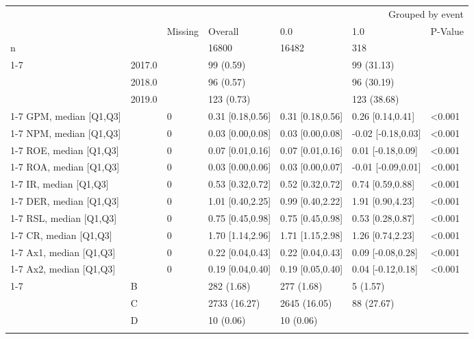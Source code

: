 \begin{tabular}{lllllll}
\toprule
 &  & \multicolumn{5}{r}{Grouped by event} \\
 &  & Missing & Overall & 0.0 & 1.0 & P-Value \\
\midrule
n &  &  & 16800 & 16482 & 318 &  \\
\cline{1-7}
\multirow[t]{4}{*}{time-event, n (%
 & 2017.0 &  & 99 (0.59) &  & 99 (31.13) &  \\
 & 2018.0 &  & 96 (0.57) &  & 96 (30.19) &  \\
 & 2019.0 &  & 123 (0.73) &  & 123 (38.68) &  \\
\cline{1-7}
GPM, median [Q1,Q3] &  & 0 & 0.31 [0.18,0.56] & 0.31 [0.18,0.56] & 0.26 [0.14,0.41] & <0.001 \\
\cline{1-7}
NPM, median [Q1,Q3] &  & 0 & 0.03 [0.00,0.08] & 0.03 [0.00,0.08] & -0.02 [-0.18,0.03] & <0.001 \\
\cline{1-7}
ROE, median [Q1,Q3] &  & 0 & 0.07 [0.01,0.16] & 0.07 [0.01,0.16] & 0.01 [-0.18,0.09] & <0.001 \\
\cline{1-7}
ROA, median [Q1,Q3] &  & 0 & 0.03 [0.00,0.06] & 0.03 [0.00,0.07] & -0.01 [-0.09,0.01] & <0.001 \\
\cline{1-7}
IR, median [Q1,Q3] &  & 0 & 0.53 [0.32,0.72] & 0.52 [0.32,0.72] & 0.74 [0.59,0.88] & <0.001 \\
\cline{1-7}
DER, median [Q1,Q3] &  & 0 & 1.01 [0.40,2.25] & 0.99 [0.40,2.22] & 1.91 [0.90,4.23] & <0.001 \\
\cline{1-7}
RSL, median [Q1,Q3] &  & 0 & 0.75 [0.45,0.98] & 0.75 [0.45,0.98] & 0.53 [0.28,0.87] & <0.001 \\
\cline{1-7}
CR, median [Q1,Q3] &  & 0 & 1.70 [1.14,2.96] & 1.71 [1.15,2.98] & 1.26 [0.74,2.23] & <0.001 \\
\cline{1-7}
Ax1, median [Q1,Q3] &  & 0 & 0.22 [0.04,0.43] & 0.22 [0.04,0.43] & 0.09 [-0.08,0.28] & <0.001 \\
\cline{1-7}
Ax2, median [Q1,Q3] &  & 0 & 0.19 [0.04,0.40] & 0.19 [0.05,0.40] & 0.04 [-0.12,0.18] & <0.001 \\
\cline{1-7}
\multirow[t]{20}{*}{Sector, n (%
 & B &  & 282 (1.68) & 277 (1.68) & 5 (1.57) &  \\
 & C &  & 2733 (16.27) & 2645 (16.05) & 88 (27.67) &  \\
 & D &  & 10 (0.06) & 10 (0.06) &  &  \\
}}
\end{tabular}
